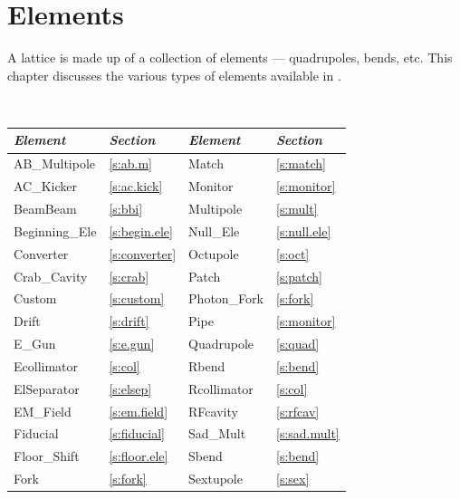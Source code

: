 \chapter{Elements}
\label{c:elements}

A lattice is made up of a collection of elements --- quadrupoles,
bends, etc. This chapter discusses the various types of elements
available in \bmad.

\begin{table}[htb]
\centering
{\tt
\begin{tabular}{llll} \toprule
  {\it Element}     & {\it Section}       & {\it Element}      & {\it Section}    \\ \midrule
  AB_Multipole      & \ref{s:ab.m}        &  Match             & \ref{s:match}    \\ 
  AC_Kicker         & \ref{s:ac.kick}     &  Monitor           & \ref{s:monitor}  \\
  BeamBeam          & \ref{s:bbi}         &  Multipole         & \ref{s:mult}     \\
  Beginning_Ele     & \ref{s:begin.ele}   &  Null_Ele          & \ref{s:null.ele} \\
  Converter         & \ref{s:converter}   &  Octupole          & \ref{s:oct}      \\
  Crab_Cavity       & \ref{s:crab}        &  Patch             & \ref{s:patch}    \\
  Custom            & \ref{s:custom}      &  Photon_Fork       & \ref{s:fork}     \\
  Drift             & \ref{s:drift}       &  Pipe              & \ref{s:monitor}  \\
  E_Gun             & \ref{s:e.gun}       &  Quadrupole        & \ref{s:quad}     \\
  Ecollimator       & \ref{s:col}         &  Rbend             & \ref{s:bend}     \\
  ElSeparator       & \ref{s:elsep}       &  Rcollimator       & \ref{s:col}      \\
  EM_Field          & \ref{s:em.field}    &  RFcavity          & \ref{s:rfcav}    \\
  Fiducial          & \ref{s:fiducial}    &  Sad_Mult          & \ref{s:sad.mult} \\
  Floor_Shift       & \ref{s:floor.ele}   &  Sbend             & \ref{s:bend}     \\
  Fork              & \ref{s:fork}        &  Sextupole         & \ref{s:sex}      \\

\end{tabular}}
\end{table}
